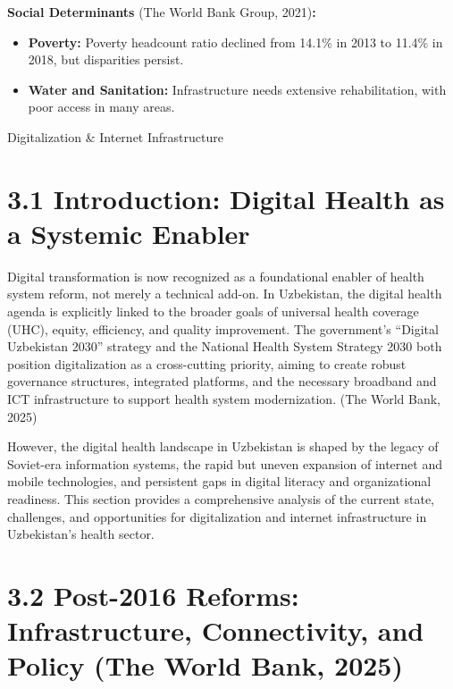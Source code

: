 \textbf{Social Determinants} (The World Bank Group, 2021)\textbf{:}

\begin{itemize}
\item
  \textbf{Poverty:} Poverty headcount ratio declined from 14.1\% in 2013
  to 11.4\% in 2018, but disparities persist.
\item
  \textbf{Water and Sanitation:} Infrastructure needs extensive
  rehabilitation, with poor access in many areas.
\end{itemize}

Digitalization \& Internet Infrastructure

\section{\texorpdfstring{\textbf{3.1 Introduction: Digital Health as a
Systemic
Enabler}}{3.1 Introduction: Digital Health as a Systemic Enabler}}\label{introduction-digital-health-as-a-systemic-enabler}

Digital transformation is now recognized as a foundational enabler of
health system reform, not merely a technical add-on. In Uzbekistan, the
digital health agenda is explicitly linked to the broader goals of
universal health coverage (UHC), equity, efficiency, and quality
improvement. The government's ``Digital Uzbekistan 2030'' strategy and
the National Health System Strategy 2030 both position digitalization as
a cross-cutting priority, aiming to create robust governance structures,
integrated platforms, and the necessary broadband and ICT infrastructure
to support health system modernization. (The World Bank, 2025)

However, the digital health landscape in Uzbekistan is shaped by the
legacy of Soviet-era information systems, the rapid but uneven expansion
of internet and mobile technologies, and persistent gaps in digital
literacy and organizational readiness. This section provides a
comprehensive analysis of the current state, challenges, and
opportunities for digitalization and internet infrastructure in
Uzbekistan's health sector.

\section{\texorpdfstring{\textbf{3.2 Post-2016 Reforms: Infrastructure,
Connectivity, and Policy} (The World Bank,
2025)}{3.2 Post-2016 Reforms: Infrastructure, Connectivity, and Policy (The World Bank, 2025)}}\label{post-2016-reforms-infrastructure-connectivity-and-policy-the-world-bank-2025}

